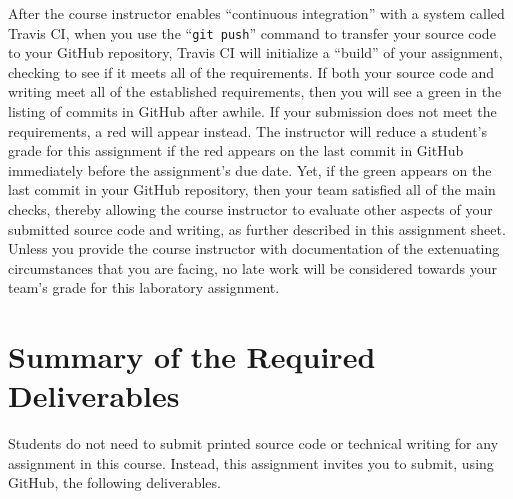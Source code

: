 \documentclass[11pt]{article}
\newcommand{\gitpush}{\command{git push}}
\newcommand{\command}[1]{``\lstinline{#1}''}
\newcommand{\step}[1]{``{#1}''}
\newcommand{\checkmark}{\ding{51}}
\newcommand{\naughtmark}{\ding{55}}
\begin{document}
After the course instructor enables \step{continuous integration} with a system called Travis CI, when you use the
\gitpush{} command to transfer your source code to your GitHub repository, Travis CI will initialize a \step{build} of
your assignment, checking to see if it meets all of the requirements. If both your source code and writing meet all of
the established requirements, then you will see a green \checkmark{} in the listing of commits in GitHub after awhile.
If your submission does not meet the requirements, a red \naughtmark{} will appear instead. The instructor will reduce a
student's grade for this assignment if the red \naughtmark{} appears on the last commit in GitHub immediately before the
assignment's due date. Yet, if the green \checkmark{} appears on the last commit in your GitHub repository, then your
team satisfied all of the main checks, thereby allowing the course instructor to evaluate other aspects of your
submitted source code and writing, as further described in this assignment sheet. Unless you provide the course
instructor with documentation of the extenuating circumstances that you are facing, no late work will be considered
towards your team's grade for this laboratory assignment.

\section*{Summary of the Required Deliverables}

\noindent Students do not need to submit printed source code or technical writing for any assignment in this course.
Instead, this assignment invites you to submit, using GitHub, the following deliverables.
\end{document}
